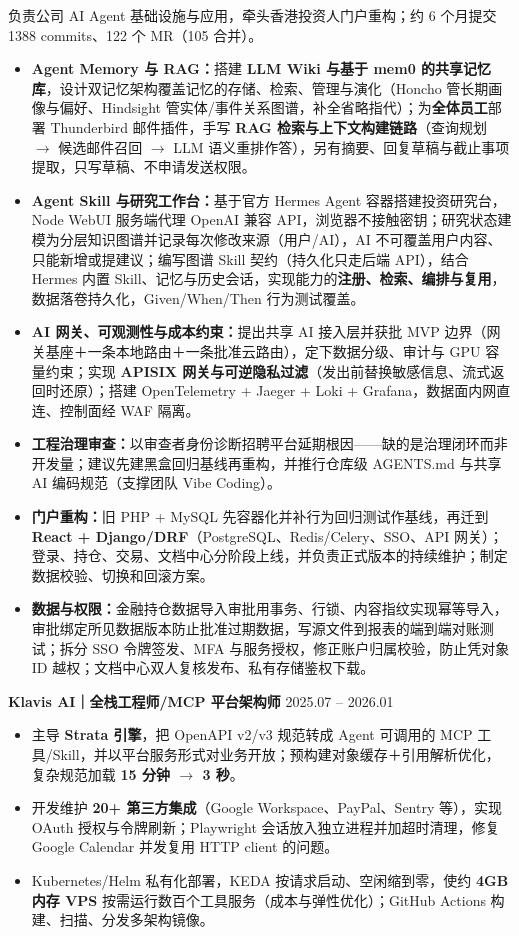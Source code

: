 \documentclass[10pt,a4paper]{article}
\begin{document}
负责公司 AI Agent 基础设施与应用，牵头香港投资人门户重构；约 6 个月提交 1388 commits、122 个 MR（105 合并）。
\begin{itemize}
	\item \textbf{Agent Memory 与 RAG：}搭建 \textbf{LLM Wiki 与基于 mem0 的共享记忆库}，设计双记忆架构覆盖记忆的存储、检索、管理与演化（Honcho 管长期画像与偏好、Hindsight 管实体/事件关系图谱，补全省略指代）；为\textbf{全体员工}部署 Thunderbird 邮件插件，手写 \textbf{RAG 检索与上下文构建链路}（查询规划 $\rightarrow$ 候选邮件召回 $\rightarrow$ LLM 语义重排作答），另有摘要、回复草稿与截止事项提取，只写草稿、不申请发送权限。
	\item \textbf{Agent Skill 与研究工作台：}基于官方 Hermes Agent 容器搭建投资研究台，Node WebUI 服务端代理 OpenAI 兼容 API，浏览器不接触密钥；研究状态建模为分层知识图谱并记录每次修改来源（用户/AI），AI 不可覆盖用户内容、只能新增或提建议；编写图谱 Skill 契约（持久化只走后端 API），结合 Hermes 内置 Skill、记忆与历史会话，实现能力的\textbf{注册、检索、编排与复用}，数据落卷持久化，Given/When/Then 行为测试覆盖。
	\item \textbf{AI 网关、可观测性与成本约束：}提出共享 AI 接入层并获批 MVP 边界（网关基座＋一条本地路由＋一条批准云路由），定下数据分级、审计与 GPU 容量约束；实现 \textbf{APISIX 网关与可逆隐私过滤}（发出前替换敏感信息、流式返回时还原）；搭建 OpenTelemetry + Jaeger + Loki + Grafana，数据面内网直连、控制面经 WAF 隔离。
	\item \textbf{工程治理审查：}以审查者身份诊断招聘平台延期根因——缺的是治理闭环而非开发量；建议先建黑盒回归基线再重构，并推行仓库级 AGENTS.md 与共享 AI 编码规范（支撑团队 Vibe Coding）。
	\item \textbf{门户重构：}旧 PHP + MySQL 先容器化并补行为回归测试作基线，再迁到 \textbf{React + Django/DRF}（PostgreSQL、Redis/Celery、SSO、API 网关）；登录、持仓、交易、文档中心分阶段上线，并负责正式版本的持续维护；制定数据校验、切换和回滚方案。
	\item \textbf{数据与权限：}金融持仓数据导入审批用事务、行锁、内容指纹实现幂等导入，审批绑定所见数据版本防止批准过期数据，写源文件到报表的端到端对账测试；拆分 SSO 令牌签发、MFA 与服务授权，修正账户归属校验，防止凭对象 ID 越权；文档中心双人复核发布、私有存储鉴权下载。
\end{itemize}

\textbf{Klavis AI｜全栈工程师/MCP 平台架构师} \hfill 2025.07 -- 2026.01
\begin{itemize}
	\item 主导 \textbf{Strata 引擎}，把 OpenAPI v2/v3 规范转成 Agent 可调用的 MCP 工具/Skill，并以平台服务形式对业务开放；预构建对象缓存＋引用解析优化，复杂规范加载 \textbf{15 分钟 $\rightarrow$ 3 秒}。
	\item 开发维护 \textbf{20+ 第三方集成}（Google Workspace、PayPal、Sentry 等），实现 OAuth 授权与令牌刷新；Playwright 会话放入独立进程并加超时清理，修复 Google Calendar 并发复用 HTTP client 的问题。
	\item Kubernetes/Helm 私有化部署，KEDA 按请求启动、空闲缩到零，使约 \textbf{4GB 内存 VPS} 按需运行数百个工具服务（成本与弹性优化）；GitHub Actions 构建、扫描、分发多架构镜像。
\end{itemize}
\end{document}
